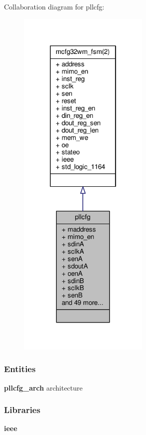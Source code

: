 Collaboration diagram for pllcfg\+:\nopagebreak
\begin{figure}[H]
\begin{center}
\leavevmode
\includegraphics[width=178pt]{de/def/classpllcfg__coll__graph}
\end{center}
\end{figure}
\subsubsection*{Entities}
\begin{DoxyCompactItemize}
\item 
{\bf pllcfg\+\_\+arch} architecture
\end{DoxyCompactItemize}
\subsubsection*{Libraries}
 \begin{DoxyCompactItemize}
\item 
{\bf ieee} 
\end{DoxyCompactItemize}
